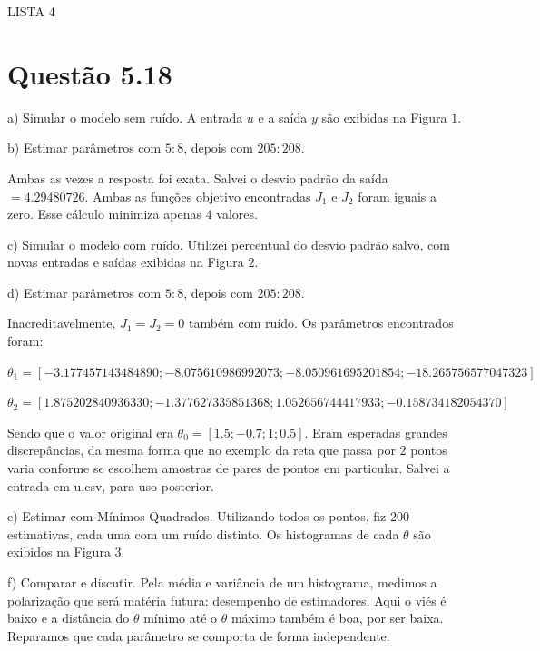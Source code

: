 \documentclass{rbfin}
\begin{document}
\rbfe{}


\large

\begin{center}
LISTA 4
\end{center}

\normalsize

\doublespacing

\section*{Questão 5.18}

a) Simular o modelo sem ruído. A entrada $u$ e a saída $y$ são exibidas na Figura $1$.

b) Estimar parâmetros com $5:8$, depois com $205:208$.

Ambas as vezes a resposta foi exata. Salvei o desvio padrão da saída $= 4.29480726$. Ambas as funções objetivo encontradas $J_1$ e $J_2$ foram iguais a zero. Esse cálculo minimiza apenas $4$ valores.

c) Simular o modelo com ruído. Utilizei percentual do desvio padrão salvo, com novas entradas e saídas exibidas na Figura $2$. 

d) Estimar parâmetros com $5:8$, depois com $205:208$.

Inacreditavelmente, $J_1 = J_2 = 0$ também com ruído. Os parâmetros encontrados foram:

$\theta_1 = [-3.177457143484890;-8.075610986992073;-8.050961695201854;-18.265756577047323]$

$\theta_2 = [1.875202840936330;-1.377627335851368;1.052656744417933;-0.158734182054370]$

Sendo que o valor original era $\theta_0 = [1.5; -0.7; 1; 0.5]$. Eram esperadas grandes discrepâncias, da mesma forma que no exemplo da reta que passa por $2$ pontos varia conforme se escolhem amostras de pares de pontos em particular. Salvei a entrada em u.csv, para uso posterior.

e) Estimar com Mínimos Quadrados. Utilizando todos os pontos, fiz $200$ estimativas, cada uma com um ruído distinto. Os histogramas de cada $\theta$ são exibidos na Figura $3$.

f) Comparar e discutir. Pela média e variância de um histograma, medimos a polarização que será matéria futura: desempenho de estimadores. Aqui o viés é baixo e a distância do $\theta$ mínimo até o $\theta$ máximo também é boa, por ser baixa. Reparamos que cada parâmetro se comporta de forma independente.
\end{document}
